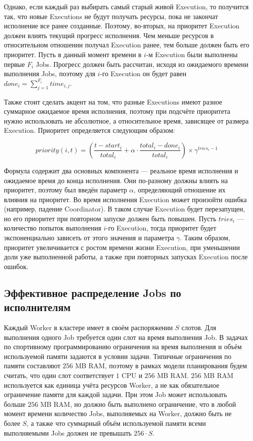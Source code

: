 Однако, если каждый раз выбирать самый старый живой Execution,
то получится так, что новые Executions не будут получать ресурсы, пока не закончат исполнение все ранее созданные.
Поэтому, во-вторых, на приоритет Execution должен влиять текущий прогресс исполнения.
Чем меньше ресурсов в относительном отношении получал Execution ранее, тем больше должен быть его приоритет.
Пусть в данный момент времени в $i$-м Execution были выполнены первые $F_i$ Jobs.
Прогресс должен быть рассчитан, исходя из ожидаемого времени выполнения Jobs,
поэтому для $i$-го Execution он будет равен $done_i = \sum_{j = 1}^{F_i} time_{i, j}$.

Также стоит сделать акцент на том, что разные Executions имеют разное суммарное ожидаемое время исполнения,
поэтому при подсчёте приоритета нужно использовать не абсолютное, а относительное время, зависящее от размера Execution.
Приоритет определяется следующим образом:

\begin{equation}
   priority(i, t) = \left(\frac{t - start_i}{total_i} + \alpha \cdot \frac{total_i - done_i}{total_i}\right) \times \gamma^{tries_i - 1}
\end{equation}

Формула содержит два основных компонента --- реальное время исполнения и ожидаемое время до конца исполнения.
Они по-разному должны влиять на приоритет, поэтому был введён параметр $\alpha$, определяющий отношение их влияния на приоритет.
Во время исполнения Execution может произойти ошибка (например, падение Coordinator).
В таком случае Execution будет перезапущен, но его приоритет при повторном запуске должен быть повышен.
Пусть $tries_i$ --- количество попыток выполнения $i$-го Execution,
тогда приоритет будет экспоненциально зависеть от этого значения и параметра $\gamma$.
Таким образом, приоритет увеличивается с ростом времени жизни Execution, при уменьшении доли уже выполненной работы,
а также при повторных запусках Execution после ошибок.

\subsection{Эффективное распределение Jobs по исполнителям}

Каждый Worker в кластере имеет в своём распоряжении $S$ слотов.
Для выполнения одного Job требуется один слот на время выполнения Job.
В задачах по спортивному программированию ограничения на время выполнения и объём используемой памяти задаются в условии задачи.
Типичные ограничения по памяти составляют $256$ MB RAM, поэтому
в рамках модели планирования будем считать, что один слот соответствует $1$ CPU и $256$ MB RAM.
$256$ MB RAM используется как единица учёта ресурсов Worker, а не как обязательное ограничение памяти для каждой задачи.
При этом Job может использовать больше $256$ MB RAM, но должно быть выполнено ограничение,
что в любой момент времени количество Jobs, выполняемых на Worker, должно быть не более $S$,
а также что суммарный объём используемой памяти всеми выполняемыми Jobs должен не превышать $256 \cdot S$.

